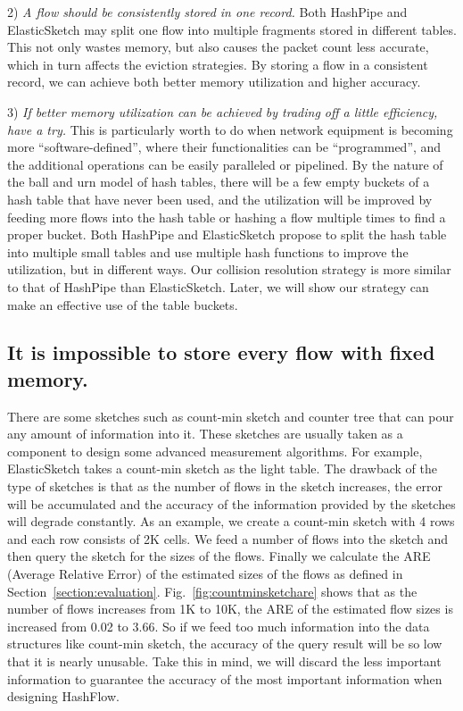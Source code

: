 2) {\em A flow should be consistently stored in one record.} Both HashPipe and ElasticSketch 
may split one flow into multiple fragments stored in different tables. This not only wastes memory, 
but also causes the packet count less accurate, which in turn affects the eviction strategies.  
By storing a flow in a consistent record, we can achieve both better memory utilization and 
higher accuracy. 

3) {\em If better memory utilization can be achieved by trading off a little efficiency, have a try.} 
This is particularly worth to do when network equipment is becoming more ``software-defined'', 
where their functionalities can be  ``programmed'', 
and the additional operations can be easily paralleled or pipelined. 
By the nature of the ball and urn model \cite{urn} of hash tables, 
there will be a few empty buckets of a hash table that have never been used, and the utilization will be improved by feeding more flows into the hash table or hashing a flow multiple times to find a proper bucket. 
Both HashPipe and ElasticSketch propose to split the hash table into multiple small tables and use multiple hash functions to improve the utilization, 
but in different ways. Our collision resolution strategy is more similar to 
that of HashPipe than ElasticSketch. 
Later, we will show our strategy can make an effective use of the table buckets.

\iffalse
\subsection{It is impossible to store every flow with fixed memory.}
There are some sketches such as count-min sketch\cite{cormode_countmin_2005} and counter tree\cite{chen_counter_2017} that can pour any amount of information into it. These sketches are usually taken as a component to design some advanced measurement algorithms. For example, ElasticSketch\cite{yang_elastic_2018} takes a count-min sketch as the light table. The drawback of the type of sketches is that as the number of flows in the sketch increases, the error will be accumulated and the accuracy of the information provided by the sketches will degrade constantly. As an example, we create a count-min sketch with 4 rows and each row consists of 2K cells. We feed a number of flows into the sketch and then query the sketch for the sizes of the flows. Finally we calculate the ARE (Average Relative Error) of the estimated sizes of the flows as defined in Section~\ref{section:evaluation}. Fig.~\ref{fig:countminsketchare} shows that as the number of flows increases from 1K to 10K, the ARE of the estimated flow sizes is increased from 0.02 to 3.66. So if we feed too much information into the data structures like count-min sketch, the accuracy of the query result will be so low that it is nearly unusable. Take this in mind, we will discard the less important information to guarantee the accuracy of the most important information when designing HashFlow.


